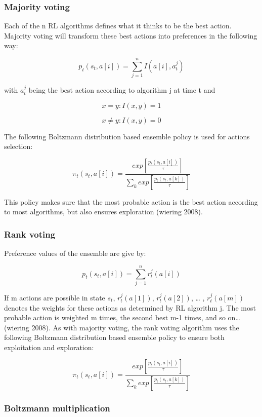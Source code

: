 \hypertarget{majority-voting}{%
\subsubsection{Majority voting}\label{majority-voting}}

Each of the n RL algorithms defines what it thinks to be the best
action. Majority voting will transform these best actions into
preferences in the following way:

\[ p_t(s_t, a[i]) = \sum_{j=1}^{n} I(a[i],a_t^j) \]

with \(a_t^j\) being the best action according to algorithm j at time t
and

\[ x=y: I(x,y) = 1 \]

\[ x \neq y: I(x,y) = 0 \]

The following Boltzmann distribution based ensemble policy is used for
actions selection:

\[ \pi_t (s_t, a[i]) = \frac{exp[\frac{p_t(s_t, a[i])}{\tau}]}{\sum_k exp[\frac{p_t(s_t, a[k])}{\tau}]} \]

This policy makes sure that the most probable action is the best action
according to most algorithms, but also ensures exploration (wiering
2008).

\hypertarget{rank-voting}{%
\subsubsection{Rank voting}\label{rank-voting}}

Preference values of the ensemble are give by:

\[ p_t(s_t, a[i]) = \sum_{j=1}^{n} r_t^j(a[i]) \]

If m actions are possible in state \(s_t\), \(r_t^j(a[1])\),
\(r_t^j(a[2])\), \ldots{} , \(r_t^j(a[m])\) denotes the weights for
these actions as determined by RL algorithm j. The most probable action
is weighted m times, the second best m-1 times, and so on\ldots{}
(wiering 2008). As with majority voting, the rank voting algorithm uses
the following Boltzmann distribution based ensemble policy to ensure
both exploitation and exploration:

\[ \pi_t (s_t, a[i]) = \frac{exp[\frac{p_t(s_t, a[i])}{\tau}]}{\sum_k exp[\frac{p_t(s_t, a[k])}{\tau}]} \]

\hypertarget{boltzmann-multiplication}{%
\subsubsection{Boltzmann
multiplication}\label{boltzmann-multiplication}}

